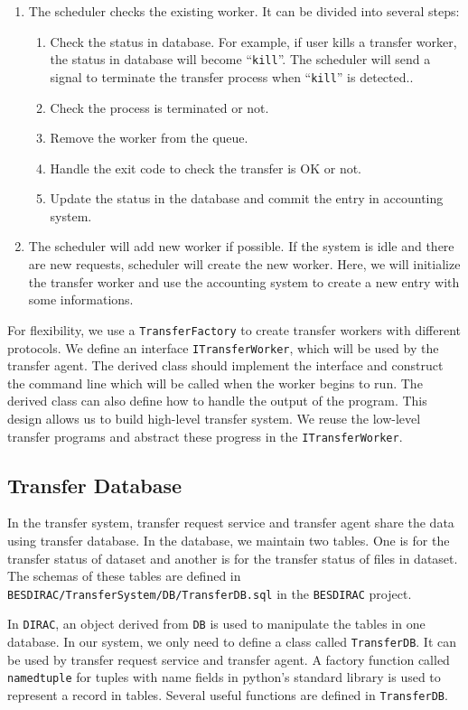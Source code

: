 \begin{enumerate}
\item The scheduler checks the existing worker.
It can be divided into several steps:
\begin{enumerate}
    \item Check the status in database.
          For example, if user kills a transfer worker, the status in
          database will become ``\verb"kill"''.
          The scheduler will
          send a signal to terminate the
          transfer process when ``\verb"kill"'' is detected..
    \item Check the process is terminated or not.
    \item Remove the worker from the queue.
    \item Handle the exit code to check the transfer is OK or not.
    \item Update the status in the database 
          and commit the entry in accounting system.
\end{enumerate}
\item The scheduler will add new worker if possible.
If the system is idle and there are new requests,
scheduler will create the new worker.
Here, we will initialize the transfer worker and use the accounting
system to create a new entry with some informations.
\end{enumerate}
For flexibility, we use a {\tt TransferFactory} to create transfer workers
with different protocols. 
We define an interface {\tt ITransferWorker},
which will be used by the transfer agent. The derived class should
implement the interface and construct the command line which will 
be called when the worker begins to run.
The derived class can also define how to handle the output of the 
program.
This design allows us to build high-level transfer system.
We reuse the low-level transfer programs and abstract these
progress in the {\tt ITransferWorker}.

\subsection{Transfer Database}

In the transfer system, transfer request service and transfer agent
share the data using transfer database. In the database, we maintain
two tables.
One is for the transfer status of dataset 
and another is for the transfer status of files in dataset. 
The schemas of these tables are defined 
in {\tt BESDIRAC/TransferSystem/DB/TransferDB.sql} in the {\tt BESDIRAC}
project\cite{bib:besdirac}.

In {\tt DIRAC}, an object derived from {\tt DB} is used to manipulate
the tables in one database. In our system, we only need to define 
a class called {\tt TransferDB}. It can be used by transfer request 
service and transfer agent. A factory function called \verb"namedtuple" 
for tuples with name fields
in python's standard library
is used to represent a record in tables.
Several useful functions are defined in {\tt TransferDB}.
